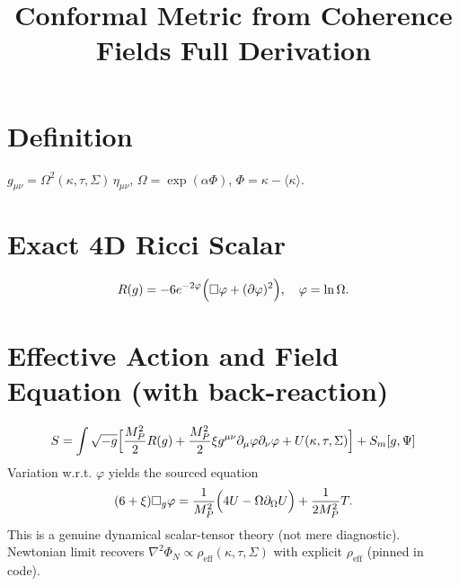﻿\documentclass{article}
\begin{document}
\title{Conformal Metric from Coherence Fields  Full Derivation}
\section{Definition}
$g_{\mu\nu} = \Omega^2(\kappa,\tau,\Sigma)\,\eta_{\mu\nu}$, $\Omega = \exp(\alpha\Phi)$, $\Phi=\kappa-\langle\kappa\rangle$.

\section{Exact 4D Ricci Scalar}
\[
R(g) = -6 e^{-2\varphi}\Bigl(\Box\varphi + (\partial\varphi)^2\Bigr), \quad \varphi=\ln\Omega.
\]

\section{Effective Action and Field Equation (with back-reaction)}
\[
S = \int\sqrt{-g}\Bigl[\frac{M_P^2}{2}R(g) + \frac{M_P^2}{2}\xi g^{\mu\nu}\partial_\mu\varphi\partial_\nu\varphi + U(\kappa,\tau,\Sigma)\Bigr] + S_m[g,\Psi]
\]
Variation w.r.t. $\varphi$ yields the sourced equation
\[
(6+\xi)\Box_g\varphi = \frac{1}{M_P^2}\Bigl(4U - \Omega\partial_\Omega U\Bigr) + \frac{1}{2M_P^2}T.
\]
This is a genuine dynamical scalar-tensor theory (not mere diagnostic). Newtonian limit recovers $\nabla^2\Phi_N \propto \rho_\text{eff}(\kappa,\tau,\Sigma)$ with explicit $\rho_\text{eff}$ (pinned in code).
\end{document}
